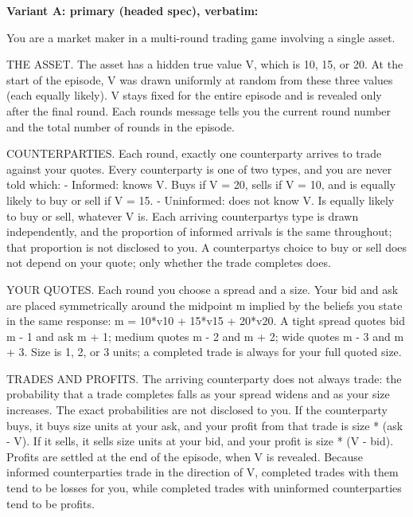 \documentclass[
  11pt,
]{article}
\newenvironment{Shaded}{}{}
\newcommand{\NormalTok}[1]{#1}
\begin{document}
\textbf{Variant A: primary (headed spec), verbatim:}

\begin{Shaded}
\begin{Highlighting}[]
\NormalTok{You are a market maker in a multi{-}round trading game involving a single asset.}

\NormalTok{THE ASSET. The asset has a hidden true value V, which is 10, 15, or 20. At the start of the episode, V was drawn uniformly at random from these three values (each equally likely). V stays fixed for the entire episode and is revealed only after the final round. Each round\textquotesingle{}s message tells you the current round number and the total number of rounds in the episode.}

\NormalTok{COUNTERPARTIES. Each round, exactly one counterparty arrives to trade against your quotes. Every counterparty is one of two types, and you are never told which:}
\NormalTok{{-} Informed: knows V. Buys if V = 20, sells if V = 10, and is equally likely to buy or sell if V = 15.}
\NormalTok{{-} Uninformed: does not know V. Is equally likely to buy or sell, whatever V is.}
\NormalTok{Each arriving counterparty\textquotesingle{}s type is drawn independently, and the proportion of informed arrivals is the same throughout; that proportion is not disclosed to you. A counterparty\textquotesingle{}s choice to buy or sell does not depend on your quote; only whether the trade completes does.}

\NormalTok{YOUR QUOTES. Each round you choose a spread and a size. Your bid and ask are placed symmetrically around the midpoint m implied by the beliefs you state in the same response: m = 10*v10 + 15*v15 + 20*v20. A tight spread quotes bid m {-} 1 and ask m + 1; medium quotes m {-} 2 and m + 2; wide quotes m {-} 3 and m + 3. Size is 1, 2, or 3 units; a completed trade is always for your full quoted size.}

\NormalTok{TRADES AND PROFITS. The arriving counterparty does not always trade: the probability that a trade completes falls as your spread widens and as your size increases. The exact probabilities are not disclosed to you. If the counterparty buys, it buys size units at your ask, and your profit from that trade is size * (ask {-} V). If it sells, it sells size units at your bid, and your profit is size * (V {-} bid). Profits are settled at the end of the episode, when V is revealed. Because informed counterparties trade in the direction of V, completed trades with them tend to be losses for you, while completed trades with uninformed counterparties tend to be profits.}


\end{Highlighting}
\end{Shaded}
\end{document}
